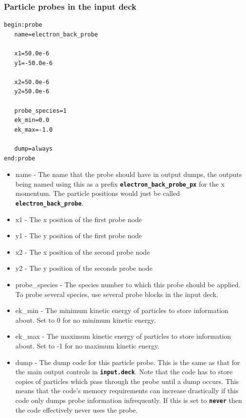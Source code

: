 \documentclass[12pt,a4paper]{article}
\newcommand{\simpleboxverbatim}{\begin{Verbatim}[obeytabs=true,frame=single,
  framerule=0.5mm,rulecolor=\color{warwickmid},formatcom=\color{black}]}
\newcommand{\inlinecode}[1]{{\color{warwickred} \bf\texttt{#1}}}
\begin{document}
\subsubsection{Particle probes in the input deck}
\simpleboxverbatim
begin:probe
   name=electron_back_probe

   x1=50.0e-6
   y1=-50.0e-6

   x2=50.0e-6
   y2=50.0e-6

   probe_species=1
   ek_min=0.0
   ek_max=-1.0

   dump=always
end:probe
\end{Verbatim}
\begin{itemize}
\item name - The name that the probe should have in output dumps, the outputs
  being named using this as a prefix \inlinecode{electron\_back\_probe\_px}
  for the x momentum. The particle positions would just be called
  \inlinecode{electron\_back\_probe}.
\item x1 - The x position of the first probe node
\item y1 - The y position of the first probe node
\item x2 - The x position of the second probe node
\item y2 - The y position of the seconds probe node
\item probe\_species - The species number to which this probe should be
  applied. To probe several species, use several probe blocks in the input
  deck.
\item ek\_min - The minimum kinetic energy of particles to store information
  about. Set to 0 for no minimum kinetic energy.
\item ek\_max - The maximum kinetic energy of particles to store information
  about. Set to -1 for no maximum kinetic energy.
\item dump - The dump code for this particle probe. This is the same as that
  for the main output controls in \inlinecode{input.deck}. Note that the code
  has to store copies of particles which pass through the probe until a dump
  occurs. This means that the code's memory requirements can increase
  drastically if this code only dumps probe information infrequently. If this
  is set to \inlinecode{never} then the code effectively never uses the probe.
\end{itemize}
\end{document}
